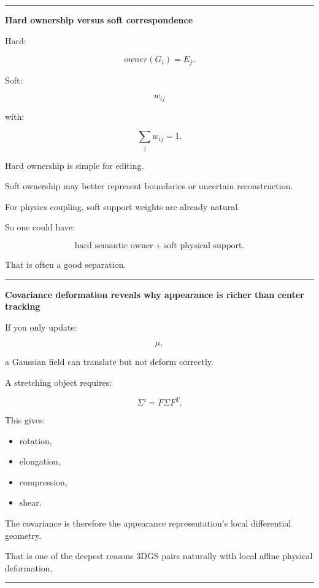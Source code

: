 \begin{center}\rule{0.5\linewidth}{0.5pt}\end{center}

\textbf{Hard ownership versus soft correspondence}

Hard:

\[
owner(G_i)=E_j.
\]

Soft:

\[
w_{ij}
\]

with:

\[
\sum_jw_{ij}=1.
\]

Hard ownership is simple for editing.

Soft ownership may better represent boundaries or uncertain reconstruction.

For physics coupling, soft support weights are already natural.

So one could have:

\[
\boxed{
\text{hard semantic owner}
+
\text{soft physical support}.
}
\]

That is often a good separation.

\begin{center}\rule{0.5\linewidth}{0.5pt}\end{center}

\textbf{Covariance deformation reveals why appearance is richer than center tracking}

If you only update:

\[
\mu,
\]

a Gaussian field can translate but not deform correctly.

A stretching object requires:

\[
\Sigma'
=
F\Sigma F^T.
\]

This gives:

\begin{itemize}
\tightlist
\item
  rotation,
\item
  elongation,
\item
  compression,
\item
  shear.
\end{itemize}

The covariance is therefore the appearance representation's local differential geometry.

That is one of the deepest reasons 3DGS pairs naturally with local affine physical deformation.

\begin{center}\rule{0.5\linewidth}{0.5pt}\end{center}

